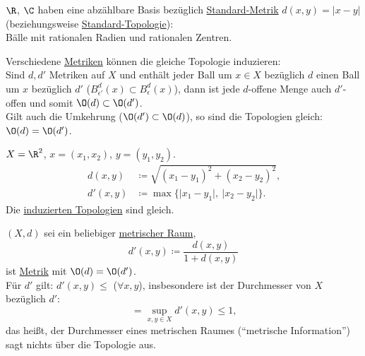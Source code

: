 \begin{example}
  \( \R \), \( \C \) haben eine abzählbare Basis bezüglich \hyperref[bsp:standardmetrik]{Standard-Metrik} \( d(x,y) = \vert x - y \vert \) (beziehungsweise \hyperref[bsp:standardtopologie]{Standard-Topologie}): \\
  Bälle mit rationalen Radien und rationalen Zentren.
\end{example}

\begin{remark}
  Verschiedene \hyperref[def:metrik]{Metriken} können die gleiche Topologie induzieren: \\
  Sind \( d, d' \) Metriken auf \( X \) und enthält jeder Ball um \( x \in X \) bezüglich \( d \) einen Ball um \( x \) bezüglich \( d' \) (\( B_{\epsilon'}^d(x) \subset B_\epsilon^d(x) \)), dann ist jede \( d \)-offene Menge auch \( d' \)-offen und somit \( \O(d) \subset \O(d') \). \\
  Gilt auch die Umkehrung (\( \O(d') \subset \O(d) \)), so sind die Topologien gleich: \( \O(d) = \O(d') \).
\end{remark}

\begin{example}
  \( X = \R^2 \), \( x = (x_1, x_2) \), \( y = (y_1, y_2) \).
  \begin{align*}
    d(x,y) &\coloneqq \sqrt{{(x_1-y_1)}^2+{(x_2-y_2)}^2}\text{,} \\
    d'(x,y) &\coloneqq \max \{ \vert x_1-y_1\vert, \ \vert x_2-y_2 \vert \}\text{.}
  \end{align*}
  Die \hyperref[def:induzierteTopologie]{induzierten Topologien} sind gleich.
\end{example}

\begin{example}
  \( (X, d) \) sei ein beliebiger \hyperref[def:metrischerRaum]{metrischer Raum},
  \begin{equation*}
    d'(x,y) \coloneqq \frac{d(x,y)}{1 + d(x,y)}
  \end{equation*}
  ist \hyperref[def:metrik]{Metrik} mit \( \O(d) = \O(d') \). \\
  Für \( d' \) gilt: \( d'(x,y) \leq \) (\( \forall x,y \)), insbesondere ist der Durchmesser von \( X \) bezüglich \( d' \):
  \begin{equation*}
    = \sup_{x,y \in X}d'(x,y) \leq 1\text{,}
  \end{equation*}
  das heißt, der Durchmesser eines metrischen Raumes (``metrische Information'') sagt nichts über die Topologie aus.
\end{example}

